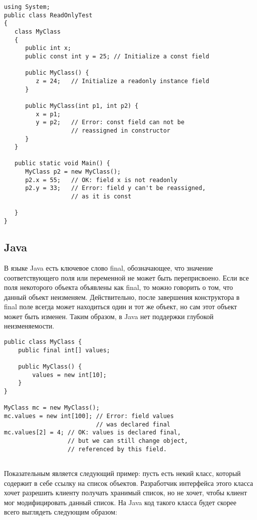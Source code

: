 \begin{lstlisting}[caption=Ключевое слово const в C\#, label=code:csharp_const]
using System;
public class ReadOnlyTest 
{
   class MyClass 
   {
      public int x;
      public const int y = 25; // Initialize a const field

      public MyClass() {
         z = 24;   // Initialize a readonly instance field
      }

      public MyClass(int p1, int p2) {
         x = p1; 
         y = p2;   // Error: const field can not be 
                   // reassigned in constructor        
      }
   }

   public static void Main() {        
      MyClass p2 = new MyClass();
      p2.x = 55;   // OK: field x is not readonly
      p2.y = 33;   // Error: field y can't be reassigned, 
                   // as it is const
      
   }
}	
\end{lstlisting}


\subsection{Java}

В языке Java есть ключевое слово final, обозначающее, что значение соответствующего поля или переменной не может быть переприсвоено. Если все поля некоторого объекта объявлены как final, то можно говорить о том, что данный объект неизменяем. Действительно, после завершения конструктора в final поле всегда может находиться один и тот же объект, но сам этот объект может быть изменен. Таким образом, в Java нет поддержки глубокой неизменяемости.

\begin{lstlisting}[caption=Ключевое слово final, label=code:java_final]
public class MyClass {
    public final int[] values;
	
    public MyClass() {
        values = new int[10];    
    }	
}

MyClass mc = new MyClass();
mc.values = new int[100]; // Error: field values 
                          // was declared final
mc.values[2] = 4; // OK: values is declared final, 
                  // but we can still change object, 
                  // referenced by this field.
    
\end{lstlisting}


Показательным является следующий пример: пусть есть некий класс, который содержит в себе ссылку на список объектов. Разработчик интерфейса этого класса хочет разрешить клиенту получать хранимый список, но не хочет, чтобы клиент мог модифицировать данный список. На Java код такого класса будет скорее всего выглядеть следующим образом:

